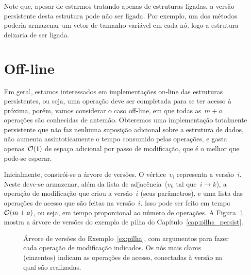 \documentclass[../../main.tex]{subfiles}
\begin{document}
Note que, apesar de estarmos tratando apenas de estruturas ligadas, a versão persistente desta estrutura pode não ser ligada. Por exemplo, um dos métodos poderia armazenar um vetor de tamanho variável em cada nó, logo a estrutura deixaria de ser ligada.

\section{Off-line}

Em geral, estamos interessados em implementações on-line das estruturas persistentes, ou seja, uma operação deve ser completada para se ter acesso à próxima, porém, vamos considerar o caso off-line, em que todas as~$m+a$ operações são conhecidas de antemão. Obteremos uma implementação totalmente persistente que não faz nenhuma suposição adicional sobre a estrutura de dados, não aumenta assintoticamente o tempo consumido pelas operações, e gasta apenas~$\mathcal{O}(1)$ de espaço adicional por passo de modificação, que é o melhor que pode-se esperar.

Inicialmente, constrói-se a árvore de versões. O vértice~$v_i$ representa a versão~$i$. Neste deve-se armazenar, além da lista de adjacência~($v_k$ tal que~$i \rightarrow k$), a operação de modificação que criou a versão~$i$ (seus parâmetros), e uma lista das operações de acesso que são feitas na versão~$i$. Isso pode ser feito em tempo~$\mathcal{O}(m+a)$, ou seja, em tempo proporcional ao número de operações.
A Figura~\ref{fig:vertree_ex} mostra a árvore de versões do exemplo de pilha do Capítulo~\ref{cap:pilha_persist}.

\begin{figure}
	\centering
	\caption{Árvore de versões do Exemplo~\ref{ex:pilha}, com argumentos para fazer cada operação de modificação indicados. Os nós mais claros (cinzentos) indicam as operações de acesso, conectadas à versão na qual são realizadas.} \label{fig:vertree_ex}
\end{figure}
\end{document}
